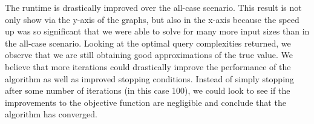 The runtime is drastically improved over the all-case scenario. 
This result is not only show via the y-axis of the graphs, 
but also in the x-axis because the speed up was so 
significant that we were able to solve for many more 
input sizes than in the all-case scenario. 
Looking at the optimal query complexities returned, 
we observe that we are still obtaining good 
approximations of the true value. 
We believe that more iterations could drastically 
improve the performance of the algorithm as well as 
improved stopping conditions. Instead of simply stopping 
after some number of iterations (in this case 100), 
we could look to see if the improvements to the objective 
function are negligible and conclude that the algorithm has converged.
